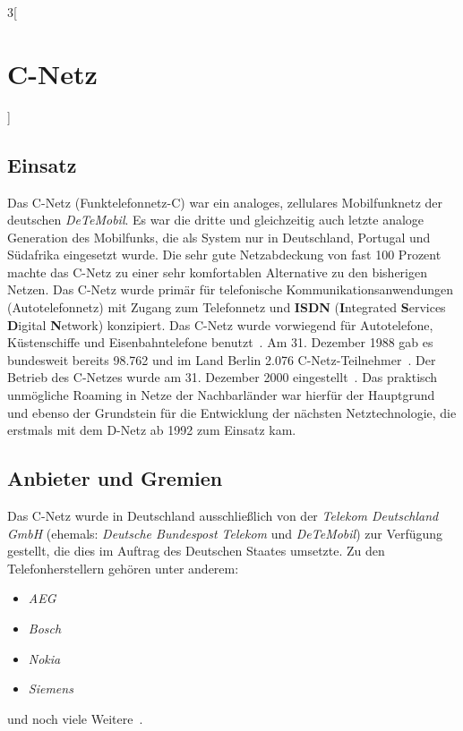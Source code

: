 \begin{multicols}{3}[\section{C-Netz}]
\subsection*{Einsatz}
Das C-Netz (Funktelefonnetz-C) war ein analoges, zellulares Mobilfunknetz der deutschen \textit{DeTeMobil}. Es war die dritte und gleichzeitig auch letzte analoge Generation des Mobilfunks, die als System nur in Deutschland, Portugal und Südafrika eingesetzt wurde. Die sehr gute Netzabdeckung von fast 100 Prozent machte das C-Netz zu einer sehr komfortablen Alternative zu den bisherigen Netzen. Das C-Netz wurde primär für telefonische Kommunikationsanwendungen (Autotelefonnetz) mit Zugang zum Telefonnetz und \textbf{ISDN} (\textbf{I}ntegrated \textbf{S}ervices \textbf{D}igital \textbf{N}etwork) konzipiert. Das C-Netz wurde vorwiegend für Autotelefone, Küstenschiffe und Eisenbahntelefone benutzt~\cite{c-netz.1}.
Am 31. Dezember 1988 gab es bundesweit bereits 98.762 und im Land Berlin 2.076 C-Netz-Teilnehmer~\cite{c-netz.3}.
Der Betrieb des C-Netzes wurde am 31. Dezember 2000 eingestellt~\cite{c-netz.6}. Das praktisch unmögliche Roaming in Netze der Nachbarländer war hierfür der Hauptgrund und ebenso der Grundstein für die Entwicklung der nächsten Netztechnologie, die erstmals mit dem D-Netz ab 1992 zum Einsatz kam.




\subsection*{Anbieter und Gremien}
Das C-Netz wurde in Deutschland ausschließlich von der \textit{Telekom Deutschland GmbH} (ehemals: \textit{Deutsche Bundespost Telekom} und \textit{DeTeMobil}) zur Verfügung gestellt, die dies im Auftrag des Deutschen Staates umsetzte. Zu den Telefonherstellern gehören unter anderem: 
\begin{itemize}
	\item \textit{AEG}
	\item \textit{Bosch}
	\item \textit{Nokia}
	\item \textit{Siemens}
\end{itemize}
und noch viele Weitere~\cite{c-netz.5}.



\end{multicols}
\newpage
